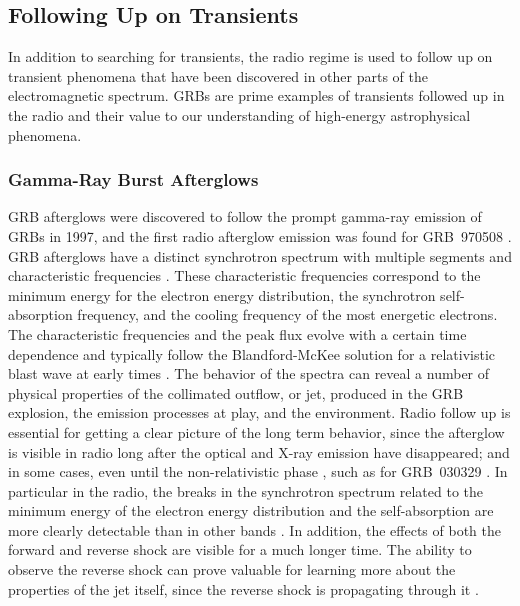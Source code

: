\documentclass[12pt]{article}
\begin{document}
\subsection{Following Up on Transients}

In addition to searching for transients, the radio regime is used to follow up on transient phenomena that have been discovered in other parts of the electromagnetic spectrum. GRBs are prime examples of transients followed up in the radio and their value to our understanding of high-energy astrophysical phenomena. 


\subsubsection{Gamma-Ray Burst Afterglows}

GRB afterglows were discovered to follow the prompt gamma-ray emission of GRBs in 1997, and the first radio afterglow emission was found for GRB~970508 \citep{1997Natur.389..261F}. GRB afterglows have a distinct synchrotron spectrum with multiple segments and characteristic frequencies \citep{1998ApJ...497L..17S,1999ApJ...523..177W}. These characteristic frequencies correspond to the minimum energy for the electron energy distribution, the synchrotron self-absorption frequency, and the cooling frequency of the most energetic electrons. The characteristic frequencies and the peak flux evolve with a certain time dependence and typically follow the Blandford-McKee solution for a relativistic blast wave at early times \citep{1976PhFl...19.1130B}. The behavior of the spectra can reveal a number of physical properties of the collimated outflow, or jet, produced in the GRB explosion, the emission processes at play, and the environment. Radio follow up is essential for getting a clear picture of the long term behavior, since the afterglow is visible in radio long after the optical and X-ray emission have disappeared; and in some cases, even until the non-relativistic phase \citep{1959sadm.book.....S, doi:10.1098/rspa.1950.0050}, such as for GRB~030329 \citep{2008A&A...480...35V}. In particular in the radio, the breaks in the synchrotron spectrum related to the minimum energy of the electron energy distribution and the self-absorption are more clearly detectable than in other bands \citep{2014PASA...31....8G}. In addition, the effects of both the forward and reverse shock are visible for a much longer time. The ability to observe the reverse shock can prove valuable for learning more about the properties of the jet itself, since the reverse shock is propagating through it \citep{2014MNRAS.444.3151V, 2013ApJ...776..119L, 2014ApJ...781...37P}. 
\end{document}
